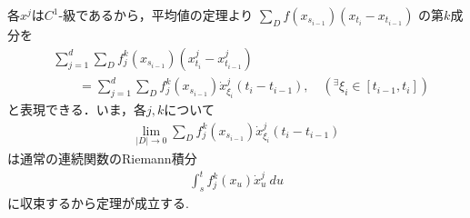 	\begin{prf}
		各$x^j$は$C^1$-級であるから，平均値の定理より
		$\sum_{D} f(x_{s_{i-1}})(x_{t_i} - x_{t_{i-1}})$
		の第$k$成分を
		\begin{align}
			&\sum_{j=1}^{d} \sum_{D} f^k_j (x_{s_{i-1}})(x^j_{t_i} - x^j_{t_{i-1}}) 
				\label{eq:thm_existence_of_Riemann_Stieltjes_integral}\\
			&\qquad 
			= \sum_{j=1}^{d} \sum_{D} f^k_j (x_{s_{i-1}}) \dot{x}^j_{\xi_i}(t_i - t_{i-1}),
			\quad ({}^\exists \xi_i \in [t_{i-1},t_i])
		\end{align}
		と表現できる．いま，各$j,k$について
		\begin{align}
			\lim_{|D| \to 0} \sum_{D} f^k_j (x_{s_{i-1}}) \dot{x}^j_{\xi_i}(t_i - t_{i-1})
		\end{align}
		は通常の連続関数のRiemann積分
		\begin{align}
			\int_s^t f^k_j (x_u) \dot{x}^j_u\ du
		\end{align}
		に収束するから定理が成立する. 
		\QED
		\begin{comment}
		が確定すれば，第$k$成分の極限が確定し定理の主張を得る．
		いま，$t \longrightarrow f^k_j(x_t)$及び$t \longmapsto (d/dt)x^j_t$は（$[s,t]$上一様）連続であるから，
		分割$D$による各区間$[t_{i-1},t_i]$において次の最大最小値が定まる:
		\begin{align}
			M_i \coloneqq \sup{t_{i-1} \leq t \leq t_i} f^k_j(x_t)\dot{x}^j_t,
			\quad m_i \coloneqq \inf{t_{i-1} \leq t \leq t_i} f^k_j(x_t)\dot{x}^j_t.
		\end{align}
		ここで
		\begin{align}
			S_D \coloneqq \sum_{D} M_i(t_i - t_{i-1}),
			\quad s_D \coloneqq \sum_{D} m_i(t_i - t_{i-1}),
			\quad \Sigma_D \coloneqq \sum_{D} f^k_j (x_{s_{i-1}}) \dot{x}^j_{\xi_i}(t_i - t_{i-1})
		\end{align}
		とおいて
		\begin{align}
			S \coloneqq \inf{D \in \delta[s,t]}{S_D},
			\quad s \coloneqq \sup{D \in \delta[s,t]}{s_D}
		\end{align}
		を定めれば
		\begin{align}
			s_D \leq s \leq S \leq S_D,
			\quad s_D \leq \Sigma_D \leq S_D
		\end{align}
		が満たされる．実際，任意の$D_1,D_2 \in \delta[s,t]$に対して，
		分割の合併を$D_3$とすれば
		\begin{align}
			s_{D_1} \leq s_{D_3} \leq S_{D_3} \leq S_{D_2}
		\end{align}
		が成立し$s \leq S_D\ (\forall D \in \delta[s,t])$すなわち$s \leq S$が出る．
		一方で一様連続性から
		\begin{align}
			0 \leq S - s \leq S_D - s_D = \sum_D (M_i - m_i)(t_i - t_{i-1})
			\longrightarrow 0
			\quad (|D| \longrightarrow 0)
		\end{align}
		が従い$s = S$を得る．以上より
		\begin{align}
			|S - \Sigma_D| \leq |S - S_D| + |S_D - \Sigma_D|
			\leq |S - S_D| + |S_D - s_D|
			\longrightarrow 0
			\quad (|D| \longrightarrow 0)
		\end{align}
		が成り立つ．
		\end{comment}
		\QED
\end{prf}


